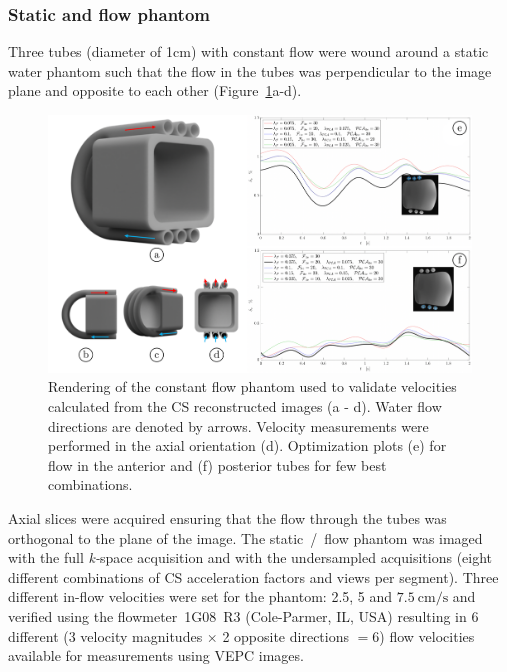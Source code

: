 \subsubsection{Static and flow phantom}
Three tubes (diameter of 1cm) with constant flow were wound around a static water phantom such that the flow in the tubes was perpendicular to the image plane and opposite to each other (Figure~\ref{fig: CSS1}a-d).
\begin{figure}[!htb]
\vspace{+0.2cm}
\centering
\includegraphics[width=1\textwidth]{Figures/CS1_3.pdf}
\caption[Rendering of the constant flow phantom and optimization plots]{Rendering of the constant flow phantom used to validate velocities calculated from the CS reconstructed images (a - d). Water flow directions are denoted by arrows. Velocity measurements were performed in the axial orientation (d). Optimization plots (e) for flow in the anterior and (f) posterior tubes for few best combinations.}
\label{fig: CSS1}
\end{figure}
Axial slices were acquired ensuring that the flow through the tubes was orthogonal to the plane of the image. 
The static~/~flow phantom was imaged with the full \mbox{\textit{k-}space} acquisition and with the undersampled acquisitions (eight different combinations of CS acceleration factors and views per segment). 
Three different in-flow velocities were set for the phantom: 2.5, 5 and $\SI{7.5}{\centi\meter/\second}$ and verified using the flowmeter~1G08~R3 (Cole-Parmer, IL, USA) resulting in 6 different (3 velocity magnitudes $\times$ 2 opposite directions $= 6$) flow velocities available for measurements using VEPC images.
